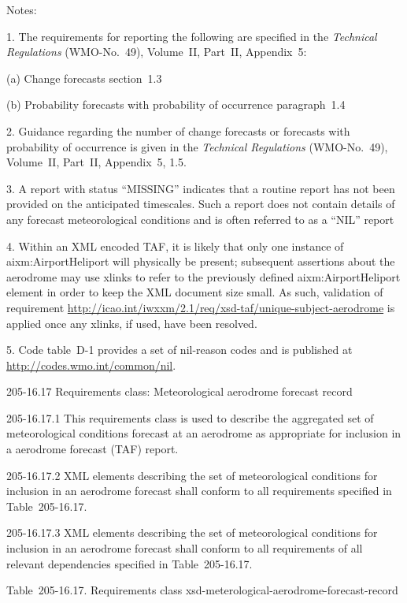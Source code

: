 Notes:

1. The requirements for reporting the following are specified in the \emph{Technical Regulations} (WMO-No.~49), Volume~II, Part~II, Appendix~5:

(a) Change forecasts section~1.3

(b) Probability forecasts with probability of occurrence paragraph~1.4

2. Guidance regarding the number of change forecasts or forecasts with probability of occurrence is given in the \emph{Technical Regulations} (WMO-No.~49), Volume~II, Part~II, Appendix~5, 1.5.

3. A report with status ``MISSING'' indicates that a routine report has not been provided on the anticipated timescales. Such a report does not contain details of any forecast meteorological conditions and is often referred to as a ``NIL'' report

4. Within an XML encoded TAF, it is likely that only one instance of aixm:AirportHeliport will physically be present; subsequent assertions about the aerodrome may use xlinks to refer to the previously defined aixm:AirportHeliport element in order to keep the XML document size small. As such, validation of requirement \url{http://icao.int/iwxxm/2.1/req/xsd-taf/unique-subject-aerodrome} is applied once any xlinks, if used, have been resolved.

5. Code table~D-1 provides a set of nil-reason codes and is published at \url{http://codes.wmo.int/common/nil}.

205-16.17 Requirements class: Meteorological aerodrome forecast record

205-16.17.1 This requirements class is used to describe the aggregated set of meteorological conditions forecast at an aerodrome as appropriate for inclusion in a aerodrome forecast (TAF) report.

205-16.17.2 XML elements describing the set of meteorological conditions for inclusion in an aerodrome forecast shall conform to all requirements specified in Table~205-16.17.

205-16.17.3 XML elements describing the set of meteorological conditions for inclusion in an aerodrome forecast shall conform to all requirements of all relevant dependencies specified in Table~205-16.17.

Table~205-16.17. Requirements class xsd-meterological-aerodrome-forecast-record


